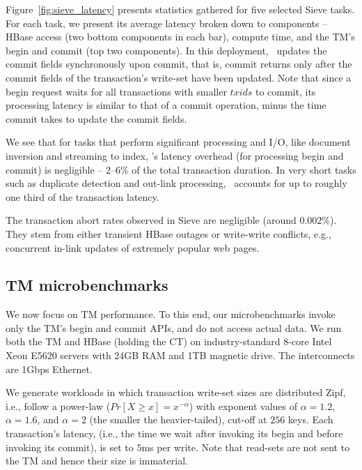 Figure~\ref{fig:sieve_latency} presents statistics gathered for five selected Sieve tasks. 
For each task, we present its average latency broken down to components --
HBase access (two bottom components in each bar), compute time, and the TM's begin and commit  (top two components). 
In this deployment, \sys\ updates the commit fields synchronously upon commit, that is, commit returns only 
after the commit fields of the transaction's write-set have been updated. 
Note that since a begin request waits for all transactions with smaller $txids$ to commit, its processing
latency is similar to that of a commit operation, minus the time commit takes to update the commit fields. 


We see that for tasks that perform significant processing and I/O,  like 
document inversion and streaming to index, 
\sys's latency overhead (for processing begin and commit) is negligible --  $2$--$6\%$ of the total transaction duration. 
In very short tasks such as duplicate detection and out-link processing, \sys\ accounts for up to roughly one third of the transaction latency.


The transaction abort rates observed in Sieve are negligible (around $0.002\%$). 
They stem from either transient HBase outages or 
write-write conflicts, e.g., concurrent in-link updates of extremely popular web pages.  

\subsection{TM microbenchmarks}
\label{sec:synthetic}

We now focus on TM performance. 
To this end, our microbenchmarks  invoke only the TM's begin and commit APIs, and do not access actual data.
We run both the TM and HBase (holding the CT) on industry-standard 8-core 
Intel Xeon E5620 servers with 24GB RAM and 1TB magnetic drive. The interconnects  are 1Gbps Ethernet.


We generate workloads in which transaction write-set sizes are distributed Zipf, i.e., follow a power-law ($Pr[X \geq x] = x^{-\alpha}$) 
with exponent values of $\alpha=1.2$, $\alpha=1.6$, and $\alpha=2$ (the smaller the heavier-tailed), cut-off at $256$ keys.
Each transaction's latency, (i.e., the time we wait after invoking its begin and before invoking its commit), is set to $5$ms per write. 
Note that read-sets are not sent to the TM and hence their size is immaterial.

